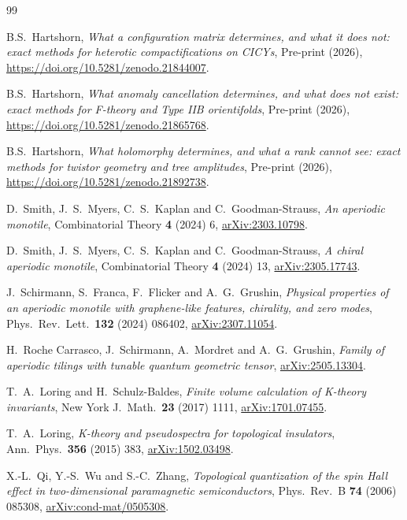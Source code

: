 \documentclass[11pt,a4paper]{article}
\theoremstyle{definition}
\begin{document}
\begin{thebibliography}{99}
\setlength{\itemsep}{1pt plus 0.5pt}

B.S.~Hartshorn,
\emph{What a configuration matrix determines, and what it does not: exact
methods for heterotic compactifications on CICYs},
Pre-print (2026), \url{https://doi.org/10.5281/zenodo.21844007}.

B.S.~Hartshorn,
\emph{What anomaly cancellation determines, and what does not exist: exact
methods for F-theory and Type IIB orientifolds},
Pre-print (2026), \url{https://doi.org/10.5281/zenodo.21865768}.

B.S.~Hartshorn,
\emph{What holomorphy determines, and what a rank cannot see: exact methods
for twistor geometry and tree amplitudes},
Pre-print (2026), \url{https://doi.org/10.5281/zenodo.21892738}.


D.~Smith, J.~S.~Myers, C.~S.~Kaplan and C.~Goodman-Strauss,
\emph{An aperiodic monotile},
Combinatorial Theory \textbf{4} (2024) 6,
\href{https://arxiv.org/abs/2303.10798}{arXiv:2303.10798}.

D.~Smith, J.~S.~Myers, C.~S.~Kaplan and C.~Goodman-Strauss,
\emph{A chiral aperiodic monotile},
Combinatorial Theory \textbf{4} (2024) 13,
\href{https://arxiv.org/abs/2305.17743}{arXiv:2305.17743}.

J.~Schirmann, S.~Franca, F.~Flicker and A.~G.~Grushin,
\emph{Physical properties of an aperiodic monotile with graphene-like
features, chirality, and zero modes},
Phys.\ Rev.\ Lett.\ \textbf{132} (2024) 086402,
\href{https://arxiv.org/abs/2307.11054}{arXiv:2307.11054}.

H.~Roche Carrasco, J.~Schirmann, A.~Mordret and A.~G.~Grushin,
\emph{Family of aperiodic tilings with tunable quantum geometric tensor},
\href{https://arxiv.org/abs/2505.13304}{arXiv:2505.13304}.

T.~A.~Loring and H.~Schulz-Baldes,
\emph{Finite volume calculation of K-theory invariants},
New York J.\ Math.\ \textbf{23} (2017) 1111,
\href{https://arxiv.org/abs/1701.07455}{arXiv:1701.07455}.

T.~A.~Loring,
\emph{K-theory and pseudospectra for topological insulators},
Ann.\ Phys.\ \textbf{356} (2015) 383,
\href{https://arxiv.org/abs/1502.03498}{arXiv:1502.03498}.

X.-L.~Qi, Y.-S.~Wu and S.-C.~Zhang,
\emph{Topological quantization of the spin Hall effect in two-dimensional
paramagnetic semiconductors},
Phys.\ Rev.\ B \textbf{74} (2006) 085308,
\href{https://arxiv.org/abs/cond-mat/0505308}{arXiv:cond-mat/0505308}.


\end{thebibliography}
\end{document}
